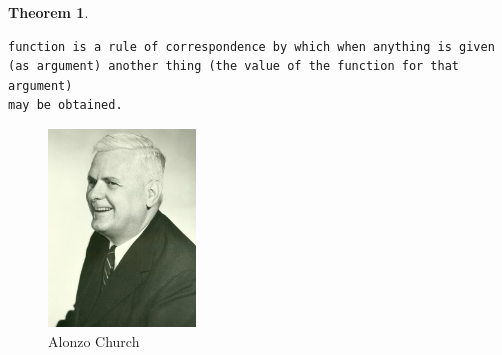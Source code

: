 \documentclass[twoside,final]{hcmut-report}
\newtheorem{theorem}{Theorem}				%
\begin{document}
\begin{theorem}
\begin{verbatim}
function is a rule of correspondence by which when anything is given 
(as argument) another thing (the value of the function for that argument) 
may be obtained.
\end{verbatim}
\end{theorem}
\begin{figure}[ht]
\centering
\includegraphics[width=0.35\textwidth]{graphics/church.jpeg}
\caption{Alonzo Church}
\end{figure}
\end{document}
